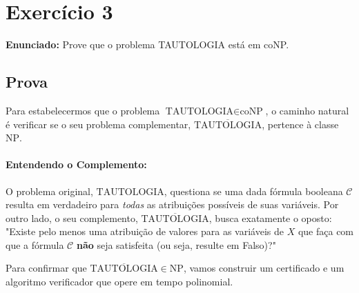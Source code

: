 \documentclass[a4paper,12pt]{article}
\begin{document}
\section*{Exercício 3}

\textbf{Enunciado:} Prove que o problema TAUTOLOGIA está em coNP.

\subsection*{Prova}

Para estabelecermos que o problema $\text{TAUTOLOGIA} \in \text{coNP}$, o caminho natural é verificar se o seu problema complementar, $\overline{\text{TAUTOLOGIA}}$, pertence à classe $\text{NP}$.

\paragraph{Entendendo o Complemento:}
O problema original, $\text{TAUTOLOGIA}$, questiona se uma dada fórmula booleana $\mathcal{C}$ resulta em verdadeiro para \textit{todas} as atribuições possíveis de suas variáveis. Por outro lado, o seu complemento, $\overline{\text{TAUTOLOGIA}}$, busca exatamente o oposto: "Existe pelo menos uma atribuição de valores para as variáveis de $X$ que faça com que a fórmula $\mathcal{C}$ \textbf{não} seja satisfeita (ou seja, resulte em Falso)?"

Para confirmar que $\overline{\text{TAUTOLOGIA}} \in \text{NP}$, vamos construir um certificado e um algoritmo verificador que opere em tempo polinomial.
\end{document}
